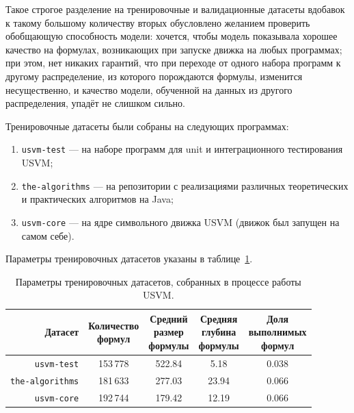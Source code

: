 Такое строгое разделение на тренировочные и валидационные датасеты вдобавок к такому большому количеству вторых обусловлено желанием проверить обобщающую способность модели: хочется, чтобы модель показывала хорошее качество на формулах, возникающих при запуске движка на любых программах; при этом, нет никаких гарантий, что при переходе от одного набора программ к другому распределение, из которого порождаются формулы, изменится несущественно, и качество модели, обученной на данных из другого распределения, упадёт не слишком сильно.

Тренировочные датасеты были собраны на следующих программах:

\begin{enumerate}
    \item \texttt{usvm-test} --- на наборе программ для unit и интеграционного тестирования USVM;
    \item \texttt{the-algorithms} --- на репозитории с реализациями различных теоретических и практических алгоритмов на Java;
    \item \texttt{usvm-core} --- на ядре символьного движка USVM (движок был запущен на самом себе).
\end{enumerate}

Параметры тренировочных датасетов указаны в таблице~\ref{usvm-train-datasets-table}.

\begin{table}[ht]
\begin{center}
\begin{tabular}{r|cccc}
    Датасет & \makecell{Количество \\ формул} & \makecell{Средний \\ размер \\ формулы} & \makecell{Средняя \\ глубина \\ формулы} & \makecell{Доля \\ выполнимых \\ формул} \\
    \hline \hline
    \rule{0pt}{2.5ex}
    \texttt{usvm-test}      & 153\,778 & 522.84 &  5.18 & 0.038 \\
    \texttt{the-algorithms} & 181\,633 & 277.03 & 23.94 & 0.066 \\
    \texttt{usvm-core}      & 192\,744 & 179.42 & 12.19 & 0.066 \\
\end{tabular}
\caption{\label{usvm-train-datasets-table} Параметры тренировочных датасетов, собранных в процессе работы USVM.}
\end{center}
\end{table}

